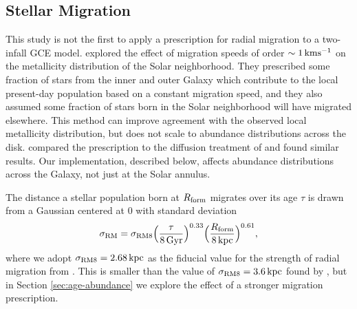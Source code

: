 \documentclass[twocolumn,twocolappendix,linenumbers]{aastex631}
\newcommand{\kpc}{\,{\rm kpc}}
\begin{document}
\subsection{Stellar Migration}
\label{sec:migration}

This study is not the first to apply a prescription for radial migration to a two-infall GCE model. \citet{spitoni_effect_2015} explored the effect of migration speeds of order $\sim1\,{\rm km}{\rm s}^{-1}$ on the metallicity distribution of the Solar neighborhood. They prescribed some fraction of stars from the inner and outer Galaxy which contribute to the local present-day population based on a constant migration speed, and they also assumed some fraction of stars born in the Solar neighborhood will have migrated elsewhere. This method can improve agreement with the observed local metallicity distribution, but does not scale to abundance distributions across the disk. \citet{palla_mgfe_2022} compared the \citet{spitoni_effect_2015} prescription to the diffusion treatment of \citet{frankel_measuring_2018} and found similar results. Our implementation, described below, affects abundance distributions across the Galaxy, not just at the Solar annulus.


The distance a stellar population born at $R_{\rm form}$ migrates over its age $\tau$ is drawn from a Gaussian centered at 0 with standard deviation
\begin{equation}
    \sigma_{\rm RM} = \sigma_{\rm RM8} \Big(\frac{\tau}{8\,{\rm Gyr}}\Big)^{0.33} \Big(\frac{R_{\rm form}}{8\kpc}\Big)^{0.61},
    \label{eq:radial-migration}
\end{equation}
where we adopt $\sigma_{\rm RM8}=2.68\kpc$ as the fiducial value for the strength of radial migration from \citet{dubay_galactic_2024}. This is smaller than the value of $\sigma_{\rm RM8}=3.6\kpc$ found by \citet{frankel_measuring_2018}, but in Section \ref{sec:age-abundance} we explore the effect of a stronger migration prescription.
\end{document}
